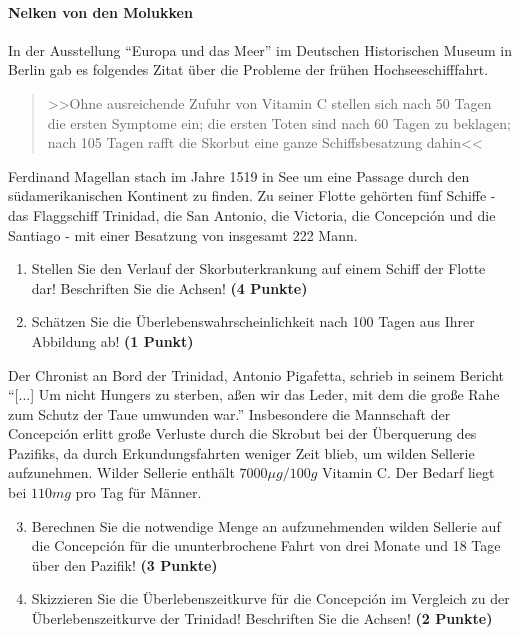 \documentclass[a4paper, 10pt]{scrartcl}\usepackage[]{graphicx}\usepackage[]{xcolor}
\begin{document}
\paragraph{Nelken von den Molukken}



In der Ausstellung "`Europa und das Meer"' im Deutschen Historischen Museum in
Berlin gab es folgendes Zitat {\"u}ber die Probleme der fr{\"u}hen Hochseeschifffahrt.

\begin{quote}
  >>Ohne ausreichende Zufuhr von Vitamin C stellen sich nach 50 Tagen die
  ersten Symptome ein; die ersten Toten sind nach 60 Tagen zu beklagen;
  nach 105 Tagen rafft die Skorbut eine ganze Schiffsbesatzung dahin<<
\end{quote}

Ferdinand Magellan stach im Jahre 1519 in See um eine Passage durch den
s{\"u}damerikanischen Kontinent zu finden. Zu seiner Flotte geh{\"o}rten
f{\"u}nf Schiffe - das Flaggschiff Trinidad, die San Antonio, die Victoria, die
Concepci{\'o}n und die Santiago - mit einer Besatzung von insgesamt
222 Mann. 

\begin{enumerate}
\item Stellen Sie den Verlauf der Skorbuterkrankung auf einem Schiff der
  Flotte dar! Beschriften Sie die Achsen! \textbf{(4 Punkte)} 
\item Sch{\"a}tzen Sie die {\"U}berlebenswahrscheinlichkeit nach 100 Tagen
  aus Ihrer Abbildung ab! \textbf{(1 Punkt)} 
\end{enumerate}


Der Chronist an Bord der Trinidad, Antonio Pigafetta, schrieb in seinem
Bericht "`[...] Um nicht Hungers zu sterben, a{\ss}en wir das Leder, mit dem
die gro{\ss}e Rahe zum Schutz der Taue umwunden war."' Insbesondere die
Mannschaft der Concepci{\'o}n erlitt gro{\ss}e Verluste durch die Skrobut bei der
{\"U}berquerung des Pazifiks, da durch Erkundungsfahrten weniger Zeit blieb, um
wilden Sellerie aufzunehmen. Wilder Sellerie enth{\"a}lt
$7000\mu g/100g$ Vitamin C. Der Bedarf liegt bei
$110mg$ pro Tag f{\"u}r M{\"a}nner.

\begin{enumerate}
  \setcounter{enumi}{2}
\item Berechnen Sie die notwendige Menge an aufzunehmenden wilden Sellerie
  auf die Concepci{\'o}n f{\"u}r die ununterbrochene Fahrt von drei Monate und 18
  Tage {\"u}ber den Pazifik! \textbf{(3 Punkte)}
\item Skizzieren Sie die {\"U}berlebenszeitkurve f{\"u}r die Concepci{\'o}n im
  Vergleich zu der {\"U}berlebenszeitkurve der Trinidad! Beschriften Sie die
  Achsen! \textbf{(2 Punkte)}
\end{enumerate}
\end{document}
